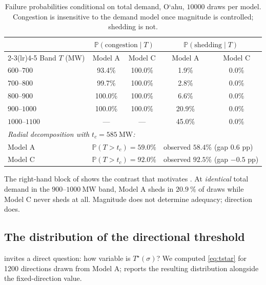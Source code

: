 \documentclass[11pt,a4paper]{article}
\theoremstyle{definition}
\theoremstyle{plain}
\theoremstyle{remark}
\newcommand{\Prob}{\mathbb{P}}
\newcommand{\okina}{\textquoteleft}
\begin{document}
\begin{table}[t]
\centering
\caption{Failure probabilities conditional on total demand, O\okina ahu,
$\num{10000}$ draws per model. Congestion is insensitive to the demand model once
magnitude is controlled; shedding is not.}
\label{tab:radial}
\begin{tabular}{lcccc}
\toprule
& \multicolumn{2}{c}{$\Prob(\text{congestion}\mid T)$}
& \multicolumn{2}{c}{$\Prob(\text{shedding}\mid T)$} \\
\cmidrule(lr){2-3}\cmidrule(lr){4-5}
Band $T$ (MW) & Model A & Model C & Model A & Model C \\
\midrule
$600$--$700$   & 93.4\% & 100.0\% & \phantom{0}1.9\% & 0.0\% \\
$700$--$800$   & 99.7\% & 100.0\% & \phantom{0}2.8\% & 0.0\% \\
$800$--$900$   & 100.0\% & 100.0\% & \phantom{0}6.6\% & 0.0\% \\
$900$--$1000$  & 100.0\% & 100.0\% & 20.9\% & 0.0\% \\
$1000$--$1100$ & --- & --- & 45.0\% & 0.0\% \\
\midrule
\multicolumn{5}{l}{\emph{Radial decomposition with $t_c = \SI{585}{\mega\watt}$:}}\\
Model A & \multicolumn{2}{l}{$\Prob(T>t_c) = 59.0\%$} & \multicolumn{2}{l}{observed $58.4\%$ \; (gap $0.6$ pp)}\\
Model C & \multicolumn{2}{l}{$\Prob(T>t_c) = 92.0\%$} & \multicolumn{2}{l}{observed $92.5\%$ \; (gap $-0.5$ pp)}\\
\bottomrule
\end{tabular}
\end{table}

The right-hand block of  shows the contrast that motivates
. At \emph{identical} total demand in the
$900$--$\SI{1000}{\mega\watt}$ band, Model A sheds in $\SI{20.9}{\percent}$ of
draws while Model C never sheds at all. Magnitude does not determine adequacy;
direction does.

\subsection{The distribution of the directional threshold}

 invites a direct question: how variable is $T^\star(\sigma)$?
We computed \eqref{eq:tstar} for \num{1200} directions drawn from Model A;
 reports the resulting distribution alongside the fixed-direction
value.
\end{document}
